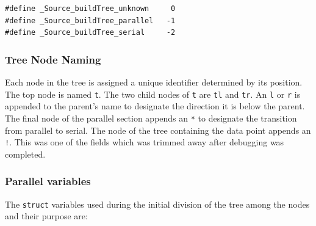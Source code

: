 \documentclass{article}
\begin{document}
\lstset{language=C++, keepspaces=true}
\begin{lstlisting}
#define _Source_buildTree_unknown     0
#define _Source_buildTree_parallel   -1
#define _Source_buildTree_serial     -2
\end{lstlisting}

%
%

\subsubsection{Tree Node Naming}

Each node in the tree is assigned a unique identifier determined by its position. The top node is named \texttt{t}. The two child nodes of \texttt{t} are \texttt{tl} and \texttt{tr}. An \texttt{l} or \texttt{r} is appended to the parent's name to designate the direction it is below the parent. The final node of the parallel section appends an \texttt{*} to designate the transition from parallel to serial. The node of the tree containing the data point appends an \texttt{!}. This was one of the fields which was trimmed away after debugging was completed.

%
%

\subsubsection{Parallel variables}

The \texttt{struct} variables used during the initial division of the tree among the nodes and their purpose are: \\
\end{document}
